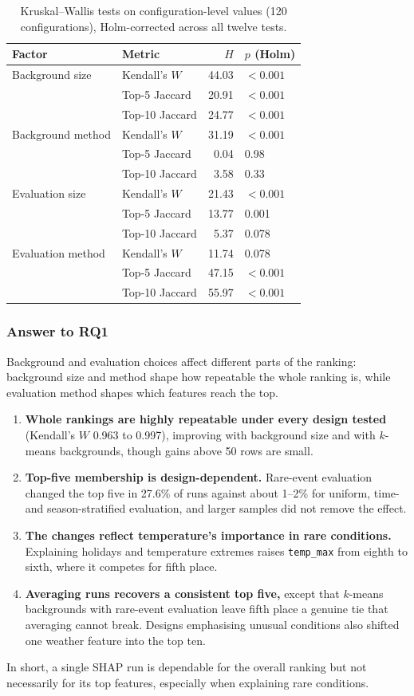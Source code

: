 \documentclass[11pt,a4paper]{article}
\newcommand{\feat}[1]{\texttt{#1}}
\begin{document}
\begin{table}[htbp]
\centering\small
\caption{Kruskal--Wallis tests on configuration-level values (120 configurations), Holm-corrected across all twelve tests.}
\label{tab:kw}
\begin{tabular}{llrl}
\toprule
Factor & Metric & $H$ & $p$ (Holm) \\
\midrule
Background size & Kendall's $W$ & 44.03 & $<0.001$ \\
 & Top-5 Jaccard & 20.91 & $<0.001$ \\
 & Top-10 Jaccard & 24.77 & $<0.001$ \\
Background method & Kendall's $W$ & 31.19 & $<0.001$ \\
 & Top-5 Jaccard & 0.04 & 0.98 \\
 & Top-10 Jaccard & 3.58 & 0.33 \\
Evaluation size & Kendall's $W$ & 21.43 & $<0.001$ \\
 & Top-5 Jaccard & 13.77 & 0.001 \\
 & Top-10 Jaccard & 5.37 & 0.078 \\
Evaluation method & Kendall's $W$ & 11.74 & 0.078 \\
 & Top-5 Jaccard & 47.15 & $<0.001$ \\
 & Top-10 Jaccard & 55.97 & $<0.001$ \\
\bottomrule
\end{tabular}
\end{table}

\subsubsection{Answer to RQ1}

Background and evaluation choices affect different parts of the ranking: background size and method shape how repeatable the whole ranking is, while evaluation method shapes which features reach the top.
\begin{enumerate}
  \item \textbf{Whole rankings are highly repeatable under every design tested} (Kendall's $W$ 0.963 to 0.997), improving with background size and with $k$-means backgrounds, though gains above 50 rows are small.
  \item \textbf{Top-five membership is design-dependent.} Rare-event evaluation changed the top five in 27.6\% of runs against about 1--2\% for uniform, time- and season-stratified evaluation, and larger samples did not remove the effect.
  \item \textbf{The changes reflect temperature's importance in rare conditions.} Explaining holidays and temperature extremes raises \feat{temp\_max} from eighth to sixth, where it competes for fifth place.
  \item \textbf{Averaging runs recovers a consistent top five,} except that $k$-means backgrounds with rare-event evaluation leave fifth place a genuine tie that averaging cannot break. Designs emphasising unusual conditions also shifted one weather feature into the top ten.
\end{enumerate}
In short, a single SHAP run is dependable for the overall ranking but not necessarily for its top features, especially when explaining rare conditions.
\end{document}

